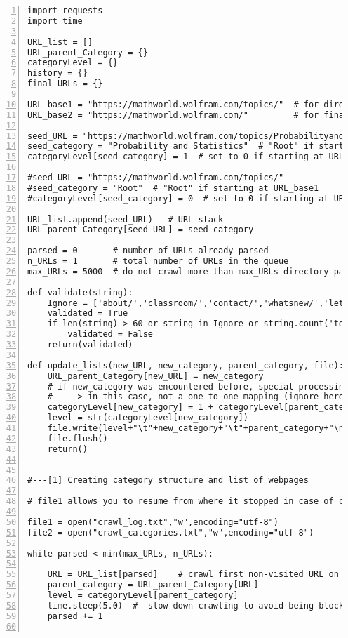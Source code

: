 \documentclass[oneside,10pt]{book}
\begin{document}
\begin{lstlisting}[numbers=left]
import requests
import time
  
URL_list = []
URL_parent_Category = {}
categoryLevel = {}
history = {}
final_URLs = {}

URL_base1 = "https://mathworld.wolfram.com/topics/"  # for directory pages (root)
URL_base2 = "https://mathworld.wolfram.com/"         # for final pages

seed_URL = "https://mathworld.wolfram.com/topics/ProbabilityandStatistics.html"
seed_category = "Probability and Statistics"  # "Root" if starting at URL_base1
categoryLevel[seed_category] = 1  # set to 0 if starting at URL_base1

#seed_URL = "https://mathworld.wolfram.com/topics/"
#seed_category = "Root"  # "Root" if starting at URL_base1
#categoryLevel[seed_category] = 0  # set to 0 if starting at URL_base1

URL_list.append(seed_URL)   # URL stack
URL_parent_Category[seed_URL] = seed_category 

parsed = 0       # number of URLs already parsed
n_URLs = 1       # total number of URLs in the queue 
max_URLs = 5000  # do not crawl more than max_URLs directory pages 

def validate(string):
    Ignore = ['about/','classroom/','contact/','whatsnew/','letters/']
    validated = True  
    if len(string) > 60 or string in Ignore or string.count('topics') > 0:
        validated = False
    return(validated)

def update_lists(new_URL, new_category, parent_category, file):
    URL_parent_Category[new_URL] = new_category
    # if new_category was encountered before, special processing required 
    #   --> in this case, not a one-to-one mapping (ignore here)
    categoryLevel[new_category] = 1 + categoryLevel[parent_category]
    level = str(categoryLevel[new_category])
    file.write(level+"\t"+new_category+"\t"+parent_category+"\n")
    file.flush()
    return()


#---[1] Creating category structure and list of webpages

# file1 allows you to resume from where it stopped in case of crash

file1 = open("crawl_log.txt","w",encoding="utf-8")
file2 = open("crawl_categories.txt","w",encoding="utf-8")

while parsed < min(max_URLs, n_URLs):  

    URL = URL_list[parsed]    # crawl first non-visited URL on the stack
    parent_category = URL_parent_Category[URL]
    level = categoryLevel[parent_category]
    time.sleep(5.0)  #  slow down crawling to avoid being blocked
    parsed += 1


\end{lstlisting}
\end{document}
